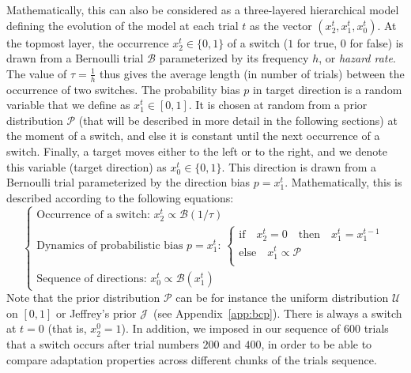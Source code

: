 \documentclass[12pt,english]{article}%
\newcommand{\choice}[1]{ %
	\left\{ %
		\begin{array}{l} #1 \end{array} %
	\right. }
\newcommand{\eql}[1]{\begin{equation}#1\end{equation}}
\newcommand{\Bb}{\mathcal{B}}
\newcommand{\Jj}{\mathcal{J}}
\newcommand{\Pp}{\mathcal{P}}
\newcommand{\Uu}{\mathcal{U}}
\newcommand{\seeApp}[1]{Appendix~\ref{app:#1}}
\begin{document}
Mathematically, this can also be considered as a three-layered hierarchical model
defining the evolution of the model at each trial $t$ as the vector  $(x_2^t, x_1^t, x_0^t)$.
At the topmost layer,
the occurrence $x_2^t \in \{ 0, 1 \}$ of a switch ($1$ for true, $0$ for false)
is  drawn from a Bernoulli trial $\Bb$ parameterized by its frequency $h$, or \emph{hazard rate}.
The value of $\tau=\frac 1 h$ thus gives the average length (in number of trials)
between the occurrence of two switches.
The probability bias $p$ in target direction is a random variable that we define as $x_1^t \in [0, 1]$.
It is chosen at random from a prior distribution $\Pp$
(that will be described in more detail in the following sections)
at the moment of a switch,
and else it is constant until the next occurrence of a switch.
Finally, a target moves either to the left or to the right,
and we denote this variable (target direction) as $x_0^t \in \{ 0, 1 \}$.
This direction is drawn from a Bernoulli trial
parameterized by the direction bias $p=x_1^t$.
Mathematically, this is  described according to the following equations:
 \eql{\choice{
\text{Occurrence of a switch: } x_2^t \propto \Bb(1/\tau) \\
\text{Dynamics of probabilistic bias $p=x_1^t$: }
 \choice{\text{if} \quad x_2^t=0 \quad \text{then} \quad  x_1^t = x_1^{t-1} \\
 \text{else} \quad x_1^t \propto \Pp  \\
 } \\
\text{Sequence of directions: } x_0^t \propto \Bb(x_1^t)
 }\label{eq:bsm}}
Note that the prior distribution $\Pp$ can be for instance
the uniform distribution $\Uu$ on $ [ 0, 1 ] $ or
Jeffrey's prior $\Jj$~(see \seeApp{bcp}).
There is always a switch at $t=0$ (that is, $x_2^0=1$).
In addition, we imposed in our sequence of $600$ trials that a switch
occurs after trial numbers $200$ and $400$,
in order to be able to compare adaptation properties across different chunks of the trials sequence.
\end{document}
